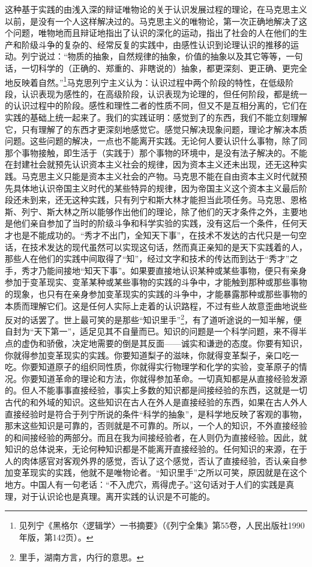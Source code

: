 \documentclass[UTF8, 12pt, a4paper]{ctexrep}
\begin{document}
这种基于实践的由浅入深的辩证唯物论的关于认识发展过程的理论，在马克思主义以前，是没有一个人这样解决过的。马克思主义的唯物论，第一次正确地解决了这个问题，唯物地而且辩证地指出了认识的深化的运动，指出了社会的人在他们的生产和阶级斗争的复杂的、经常反复的实践中，由感性认识到论理认识的推移的运动。列宁说过：“物质的抽象，自然规律的抽象，价值的抽象以及其它等等，一句话，一切科学的（正确的、郑重的、非瞎说的）抽象，都更深刻、更正确、更完全地反映着自然。”\footnote{见列宁《黑格尔〈逻辑学〉一书摘要》（《列宁全集》第55卷，人民出版社1990年版，第142页）。}马克思列宁主义认为：认识过程中两个阶段的特性，在低级阶段，认识表现为感性的，在高级阶段，认识表现为论理的，但任何阶段，都是统一的认识过程中的阶段。感性和理性二者的性质不同，但又不是互相分离的，它们在实践的基础上统一起来了。我们的实践证明：感觉到了的东西，我们不能立刻理解它，只有理解了的东西才更深刻地感觉它。感觉只解决现象问题，理论才解决本质问题。这些问题的解决，一点也不能离开实践。无论何人要认识什么事物，除了同那个事物接触，即生活于（实践于）那个事物的环境中，是没有法子解决的。不能在封建社会就预先认识资本主义社会的规律，因为资本主义还未出现，还无这种实践。马克思主义只能是资本主义社会的产物。马克思不能在自由资本主义时代就预先具体地认识帝国主义时代的某些特异的规律，因为帝国主义这个资本主义最后阶段还未到来，还无这种实践，只有列宁和斯大林才能担当此项任务。马克思、恩格斯、列宁、斯大林之所以能够作出他们的理论，除了他们的天才条件之外，主要地是他们亲自参加了当时的阶级斗争和科学实验的实践，没有这后一个条件，任何天才也是不能成功的。“秀才不出门，全知天下事”，在技术不发达的古代只是一句空话，在技术发达的现代虽然可以实现这句话，然而真正亲知的是天下实践着的人，那些人在他们的实践中间取得了“知”，经过文字和技术的传达而到达于“秀才”之手，秀才乃能间接地“知天下事”。如果要直接地认识某种或某些事物，便只有亲身参加于变革现实、变革某种或某些事物的实践的斗争中，才能触到那种或那些事物的现象，也只有在亲身参加变革现实的实践的斗争中，才能暴露那种或那些事物的本质而理解它们。这是任何人实际上走着的认识路程，不过有些人故意歪曲地说些反对的话罢了。世上最可笑的是那些“知识里手”\footnote{里手，湖南方言，内行的意思。}，有了道听途说的一知半解，便自封为“天下第一”，适足见其不自量而已。知识的问题是一个科学问题，来不得半点的虚伪和骄傲，决定地需要的倒是其反面——诚实和谦逊的态度。你要有知识，你就得参加变革现实的实践。你要知道梨子的滋味，你就得变革梨子，亲口吃一吃。你要知道原子的组织同性质，你就得实行物理学和化学的实验，变革原子的情况。你要知道革命的理论和方法，你就得参加革命。一切真知都是从直接经验发源的。但人不能事事直接经验，事实上多数的知识都是间接经验的东西，这就是一切古代的和外域的知识。这些知识在古人在外人是直接经验的东西，如果在古人外人直接经验时是符合于列宁所说的条件“科学的抽象”，是科学地反映了客观的事物，那末这些知识是可靠的，否则就是不可靠的。所以，一个人的知识，不外直接经验的和间接经验的两部分。而且在我为间接经验者，在人则仍为直接经验。因此，就知识的总体说来，无论何种知识都是不能离开直接经验的。任何知识的来源，在于人的肉体感官对客观外界的感觉，否认了这个感觉，否认了直接经验，否认亲自参加变革现实的实践，他就不是唯物论者。“知识里手”之所以可笑，原因就是在这个地方。中国人有一句老话：“不入虎穴，焉得虎子。”这句话对于人们的实践是真理，对于认识论也是真理。离开实践的认识是不可能的。
\end{document}
